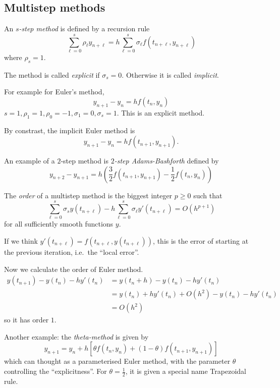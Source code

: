 \documentclass[a4paper]{article}
\begin{document}
\subsection{Multistep methods}

An \emph{\(s\)-step method} is defined by a recursion rule
\begin{equation}
  \label{eqn:multi-step}
  \sum_{\ell = 0}^s \rho_\ell y_{n + \ell} = h \sum_{\ell = 0}^s \sigma_\ell f(t_{n + \ell}, y_{n + \ell})
\end{equation}
where \(\rho_s = 1\).

The method is called \emph{explicit} if \(\sigma_s = 0\). Otherwise it is called \emph{implicit}.

For example for Euler's method,
\[
  y_{n + 1} - y_n = hf(t_n, y_n)
\]
\(s = 1, \rho_1 = 1, \rho_0 = -1, \sigma_1 = 0, \sigma_s = 1\).
This is an explicit method.

By constrast, the implicit Euler method is
\[
  y_{n + 1} - y_n = hf(t_{n + 1}, y_{n + 1}).
\]

An example of a \(2\)-step method is \emph{\(2\)-step Adams-Bashforth} defined by
\[
  y_{n + 2} - y_{n + 1} = h \left( \frac{3}{2}f(t_{n + 1}, y_{n + 1}) - \frac{1}{2}f(t_n, y_n) \right)
\]

\begin{definition}[Order]
  The \emph{order} of a multistep method is the biggest integer \(p \geq 0\) such that
  \[
    \sum_{\ell = 0}^s \sigma_s y(t_{n + \ell}) - h \sum_{\ell = 0}^s \sigma_\ell y'(t_{n + \ell}) = O(h^{p + 1})
  \]
  for all sufficiently smooth functions \(y\).
\end{definition}

If we think \(y'(t_{n + \ell}) = f(t_{n + \ell}, y(t_{n + \ell}))\), this is the error of starting at the previous iteration, i.e.\ the ``local error''.

Now we calculate the order of Euler method.
\begin{align*}
  y(t_{n + 1}) - y(t_n) - hy'(t_n)
  &= y(t_n + h) - y(t_n) - hy'(t_n) \\
  &= y(t_n) + hy'(t_n) + O(h^2) - y(t_n) -hy'(t_n) \\
  &= O(h^2)
\end{align*}
so it has order \(1\).

Another example: the \emph{theta-method} is given by
\[
  y_{n + 1} = y_n + h[\theta f(t_n, y_n) + (1 - \theta) f(t_{n + 1}, y_{n + 1})]
\]
which can thought as a parameterised Euler method, with the parameter \(\theta\) controlling the ``explicitness''. For \(\theta = \frac{1}{2}\), it is given a special name Trapezoidal rule.
\end{document}
